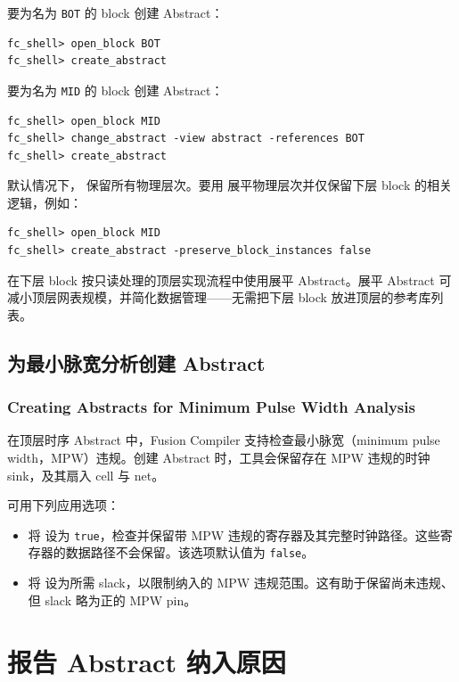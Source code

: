 要为名为 \texttt{BOT} 的 block 创建 Abstract：
\begin{lstlisting}
fc_shell> open_block BOT
fc_shell> create_abstract
\end{lstlisting}

要为名为 \texttt{MID} 的 block 创建 Abstract：
\begin{lstlisting}
fc_shell> open_block MID
fc_shell> change_abstract -view abstract -references BOT
fc_shell> create_abstract
\end{lstlisting}

默认情况下， 保留所有物理层次。要用  展平物理层次并仅保留下层 block 的相关逻辑，例如：
\begin{lstlisting}
fc_shell> open_block MID
fc_shell> create_abstract -preserve_block_instances false
\end{lstlisting}

在下层 block 按只读处理的顶层实现流程中使用展平 Abstract。展平 Abstract 可减小顶层网表规模，并简化数据管理——无需把下层 block 放进顶层的参考库列表。

\subsection{为最小脉宽分析创建 Abstract}
\subsubsection*{Creating Abstracts for Minimum Pulse Width Analysis}

在顶层时序 Abstract 中，Fusion Compiler 支持检查最小脉宽（minimum pulse width，MPW）违规。创建 Abstract 时，工具会保留存在 MPW 违规的时钟 sink，及其扇入 cell 与 net。

可用下列应用选项：
\begin{itemize}
  \item 将  设为 \texttt{true}，检查并保留带 MPW 违规的寄存器及其完整时钟路径。这些寄存器的数据路径不会保留。该选项默认值为 \texttt{false}。
  \item 将  设为所需 slack，以限制纳入的 MPW 违规范围。这有助于保留尚未违规、但 slack 略为正的 MPW pin。
\end{itemize}

\section{报告 Abstract 纳入原因}
